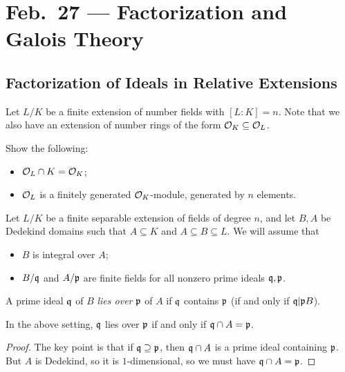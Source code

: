 \chapter{Feb.~27 --- Factorization and Galois Theory}

\section{Factorization of Ideals in Relative Extensions}

\begin{remark}
  Let $L / K$ be a finite extension of number fields
  with $[L : K] = n$. Note that we also have an extension
  of number rings of the form $\mathcal{O}_K \subseteq \mathcal{O}_L$.
\end{remark}

\begin{exercise}
  Show the following:
  \begin{itemize}
    \item $\mathcal{O}_L \cap K = \mathcal{O}_K$;
    \item $\mathcal{O}_L$ is a finitely generated $\mathcal{O}_K$-module,
      generated by $n$ elements.
  \end{itemize}
\end{exercise}

\begin{remark}
  Let $L / K$ be a finite separable extension of
  fields of degree $n$, and let $B, A$ be Dedekind
  domains such that $A \subseteq K$ and
  $A \subseteq B \subseteq L$. We will assume that
  \begin{itemize}
    \item $B$ is integral over $A$;
    \item $B / \mathfrak{q}$ and $A / \mathfrak{p}$ are finite fields
      for all nonzero prime ideals $\mathfrak{q}, \mathfrak{p}$.
  \end{itemize}
\end{remark}

\begin{definition}
  A prime ideal $\mathfrak{q}$ of $B$ \emph{lies over} $\mathfrak{p}$
  of $A$ if $\mathfrak{q}$ contains $\mathfrak{p}$ (if and only if $\mathfrak{q} | \mathfrak{p} B$).
\end{definition}

\begin{lemma}
  In the above setting, $\mathfrak{q}$ lies over $\mathfrak{p}$ if and only
  if $\mathfrak{q} \cap A = \mathfrak{p}$.
\end{lemma}

\begin{proof}
  The key point is that if $\mathfrak{q} \supseteq \mathfrak{p}$, then
  $\mathfrak{q} \cap A$ is a prime ideal containing $\mathfrak{p}$.
  But $A$ is Dedekind, so it is $1$-dimensional, so
  we must have $\mathfrak{q} \cap A = \mathfrak{p}$.
\end{proof}

